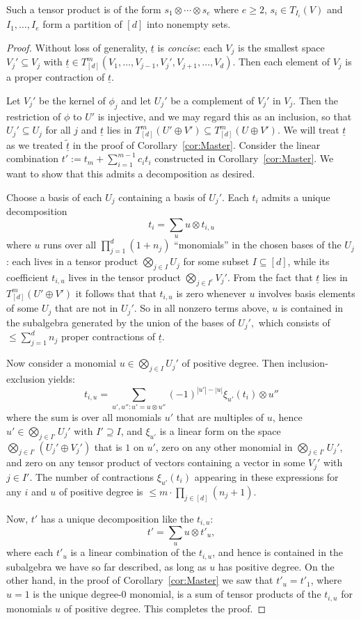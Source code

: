 \documentclass{amsart}
\newcommand{\ul}[1]{\underline{#1}}
\begin{document}
Such a tensor product is of the form $s_1 \otimes \cdots \otimes s_e$
where $e \geq 2$, $s_i \in T_{I_i}(V)$ and $I_1,\ldots,I_e$ form a
partition of $[d]$ into nonempty sets. 

\begin{proof}
Without loss of generality, $\ul{t}$ is {\em concise}: each
$V_j$ is the smallest space $V_j' \subseteq V_j$ with $\ul{t} \in
T_{[d]}^m(V_1,\ldots,V_{j-1},V_j',V_{j+1},\ldots,V_d)$. Then each element
of $V_j$ is a proper contraction of $\ul{t}$.

Let $V_j'$ be the kernel of $\phi_j$ and let $U_j'$ be a complement of
$V_j'$ in $V_j$. Then the restriction of $\phi$ to $U'$ is injective,
and we may regard this as an inclusion, so that $U_j' \subseteq U_j$ for
all $j$ and $\ul{t}$ lies in $T^m_{[d]} (U' \oplus V') \subseteq T^m_{[d]}
(U \oplus V')$. We will treat $\ul{t}$ as we treated $\tilde{\ul{t}}$ in the
proof of Corollary~\ref{cor:Master}. Consider the linear combination
$t':=t_m+\sum_{i=1}^{m-1} c_i t_i$ constructed
in Corollary~\ref{cor:Master}. We want to show that this admits a
decomposition as desired.

Choose a basis of each $U_j$ containing a basis of $U_j'$. 
Each $t_i$ admits a unique decomposition
\[ t_i=\sum_u u \otimes t_{i,u} \]
where $u$ runs over all $\prod_{j=1}^d (1+ n_j)$ ``monomials'' in the
chosen bases of the $U_j$: each lives in a tensor product $\bigotimes_{j
\in I} U_j$ for some subset $I \subseteq [d]$, while its coefficient $t_{i,u}$ lives in the tensor product
$\bigotimes_{j \in I^c} V_j'$. From the fact that $\ul{t}$ lies in $T^m_{[d]}(U'
\oplus V')$ it follows that that $t_{i,u}$ is zero whenever $u$ involves
basis elements of some $U_j$ that are not in $U_j'$. So in all nonzero
terms above, $u$ is contained in the subalgebra generated by the union
of the bases of $U_j',$ which consists of  $\le \sum_{j=1}^{d} n_j$
proper contractions of $\ul{t}$. 

Now consider a monomial $u \in \bigotimes_{j \in I} U_j'$ of positive
degree. Then inclusion-exclusion yields:
\[ t_{i,u}=\sum_{u',u'': u'=u \otimes u''} 
(-1)^{|u'|-|u|} \xi_{u'}(t_i) \otimes u'' \]
where the sum is over all monomials $u'$ that are multiples of $u$,
hence $u' \in \bigotimes_{j \in I'} U_j'$ with $I' \supseteq I$, 
and $\xi_{u'}$ is a linear form on the space $\bigotimes_{j \in I'}
(U_j' \oplus V_j')$ that is $1$ on $u'$, zero on any other monomial in
$\bigotimes_{j \in I'} U_j'$, and zero on any tensor product of vectors
containing a vector in some $V_j'$ with $j \in I'$. The number of
contractions $\xi_{u'}(t_i)$ appearing in these expressions for any
$i$ and $u$ of positive degree is $\leq m\cdot \prod_{j\in [d]}
(n_j+1).$ 

Now, $t'$ has a unique decomposition like the $t_{i,u}$:
\[ t'=\sum_u u \otimes t'_u, \]
where each $t'_u$ is a linear combination of the $t_{i,u}$, and
hence is contained in the subalgebra we have so far described, as long as $u$ has positive degree.
 On the other hand, in the proof of Corollary~\ref{cor:Master}
we saw that $t'_u=t'_1$, where $u=1$ is the unique degree-$0$ monomial,
is a sum of tensor products of the $t_{i,u}$ for monomials $u$
of positive degree. This completes the proof.
\end{proof}
\end{document}
